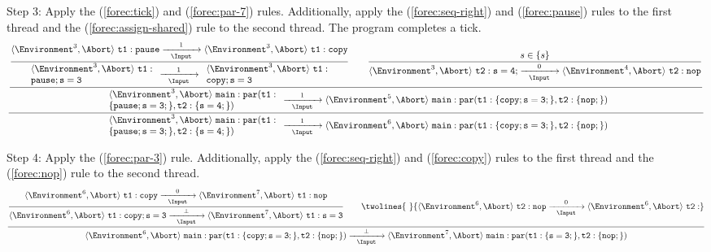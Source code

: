 \noindent
Step 3: Apply the (\ref{forec:tick}) and (\ref{forec:par-7}) 
rules. Additionally, apply the (\ref{forec:seq-right}) and (\ref{forec:pause}) rules to the 
first thread and the (\ref{forec:assign-shared}) rule to the second thread. The program completes a 
tick.
\begin{equation*}
	\frac{
		\dfrac{
			\dfrac{
					\langle \Environment^3, \Abort \rangle ~ \mathtt{t1: pause}
						\xrightarrow[~~\Input~~]{1} 
					\langle \Environment^3, \Abort \rangle ~ \mathtt{t1: copy}
				}{
					\begin{array}{l}
						\langle \Environment^3, \Abort \rangle ~ \mathtt{t1:}			\\
						\mathtt{pause; s=3}
					\end{array}
							\xrightarrow[~~\Input~~]{1}
					\begin{array}{l}
						\langle \Environment^3, \Abort \rangle ~ \mathtt{t1:}			\\
						\mathtt{copy; s=3}
					\end{array}
				}
				\qquad
			\dfrac{
					s \in \lbrace s \rbrace
				}{
					\langle \Environment^3, \Abort \rangle ~ \mathtt{t2: s=4;}
						\xrightarrow[~~\Input~~]{0} 
					\langle \Environment^4, \Abort \rangle ~ \mathtt{t2: nop}
				}
			}{
				\begin{array}{l}
					\langle \Environment^3, \Abort \rangle ~ \mathtt{main: par(t1:}		\\
					\mathtt{\{pause; s=3;\},t2:\{s=4;\})}
				\end{array}
					\xrightarrow[~~\Input~~]{1} 
				\langle \Environment^5, \Abort \rangle ~ \mathtt{main: par(t1:\{copy; s=3;\}, t2:\{nop;\})}
			}
		}{
			\begin{array}{l}
				\langle \Environment^3, \Abort \rangle ~ \mathtt{main: par(t1:}			\\
				\mathtt{\{pause; s=3;\},t2:\{s=4;\})}
			\end{array}
				\xrightarrow[~~\Input~~]{1} 
			\langle \Environment^6, \Abort \rangle ~ \mathtt{main: par(t1:\{copy; s=3;\}, t2:\{nop;\})}
		}
\end{equation*}

\noindent
Step 4: Apply the (\ref{forec:par-3}) rule. Additionally, apply the (\ref{forec:seq-right}) and 
(\ref{forec:copy}) rules to the first thread and the (\ref{forec:nop}) rule to the second thread.
\begin{equation*}
	\frac{
		\dfrac{
				\langle \Environment^6, \Abort \rangle ~ \mathtt{t1: copy}
					\xrightarrow[~~\Input~~]{0} 
				\langle \Environment^7, \Abort \rangle ~ \mathtt{t1: nop}
			}{
				\langle \Environment^6, \Abort \rangle ~ \mathtt{t1: copy; s=3}
						\xrightarrow[~~\Input~~]{\bot}
				\langle \Environment^7, \Abort \rangle ~ \mathtt{t1: s=3}
			}
			\qquad
		\twolines{
			~
			}{
				\langle \Environment^6, \Abort \rangle ~ \mathtt{t2: nop}
					\xrightarrow[~~\Input~~]{0} 
				\langle \Environment^6, \Abort \rangle ~ \mathtt{t2: }
			}
		}{
			\langle \Environment^6, \Abort \rangle ~ \mathtt{main: par(t1:\{copy; s=3;\}, t2:\{nop;\})}
				\xrightarrow[~~\Input~~]{\bot} 
			\langle \Environment^7, \Abort \rangle ~ \mathtt{main: par(t1:\{s=3;\}, t2:\{nop;\})}
		}
\end{equation*}

